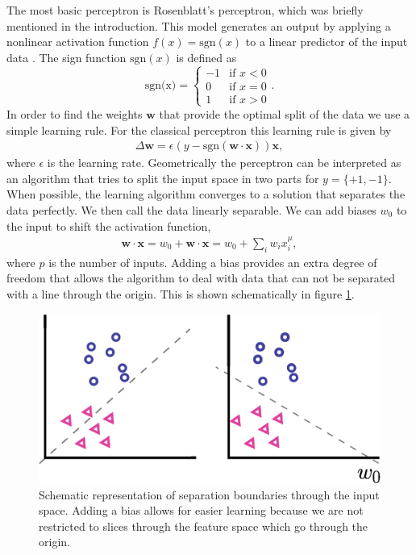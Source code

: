 \noindent The most basic perceptron is Rosenblatt's perceptron, which was briefly mentioned in the introduction. This model generates an output by applying a nonlinear activation function $f(x) = \text{sgn}(x)$ to a linear predictor of the input data \cite{Rosenblatt1958}. The sign function $\text{sgn}(x)$ is defined as
\begin{equation*}
   \text{sgn(x)}=\begin{cases}
    -1 & \text{if $x<0$}\\
    0 & \text{if $x=0$}\\
     1 & \text{if $x>0$}
   \end{cases}.
\end{equation*}
In order to find the weights $\mathbf{w}$ that provide the optimal split of the data we use a simple learning rule. For the classical perceptron this learning rule is given by
\begin{align}
    \Delta \mathbf{w} = \epsilon (y - \text{sgn}(\mathbf{w}\cdot \mathbf{x})) \mathbf{x}, \label{eq:rosenblatt}
\end{align}
where $\epsilon$ is the learning rate. Geometrically the perceptron can be interpreted as an algorithm that tries to split the input space in two parts for $y=\{+1,-1\}$. When possible, the learning algorithm converges to a solution that separates the data perfectly. We then call the data linearly separable. We can add biases $w_0$ to the input to shift the activation function,
\begin{align*}
    \mathbf{w}\cdot\mathbf{x} = w_0 + \mathbf{w}\cdot\mathbf{x}  = w_0 + \sum_i w_ix_i^\mu,
\end{align*}
where $p$ is the number of inputs. Adding a bias provides an extra degree of freedom that allows the algorithm to deal with data that can not be separated with a line through the origin. This is shown schematically in figure \ref{fig:bias}. 
\begin{figure}[htb!]
    \centering
    \includegraphics[width=\textwidth]{figures/chapter3/bias.eps}
    \caption{Schematic representation of separation boundaries through the input space. Adding a bias allows for easier learning because we are not restricted to slices through the feature space which go through the origin. }
    \label{fig:bias}
\end{figure}

